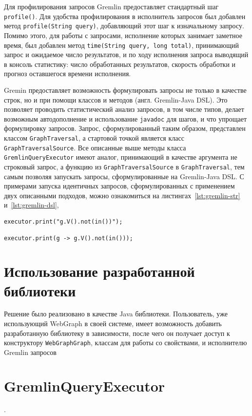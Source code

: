 \documentclass[times,specification,annotation]{itmo-student-thesis}
\begin{document}
Для профилирования запросов Gremlin предоставляет стандартный шаг \texttt{profile()}. Для удобства профилирования в исполнитель запросов был добавлен метод \texttt{profile(String query)}, добавляющий этот шаг к изначальному запросу. Помимо этого, для работы с запросами, исполнение которых занимает заметное время, был добавлен метод \texttt{time(String query, long total)}, принимающий запрос и ожидаемое число результатов, и по ходу исполнения запроса выводящий в консоль статистику: число обработанных результатов, скорость обработки и прогноз оставшегося времени исполнения.

Gremin предоставляет возможность формулировать запросы не только в качестве строк, но и при помощи классов и методов (англ. Gremlin-Java DSL). Это позволяет проводить статистический анализ запросов, в том числе типов, делает возможным автодополнение и использование \texttt{javadoc} для шагов, и что упрощает формулировку запросов. Запрос, сформулированный таким образом, представлен классом \texttt{GraphTraversal}, а стартовой точкой является класс \texttt{GraphTraversalSource}. Все описанные выше методы класса \texttt{GremlinQueryExecutor} имеют аналог, принимающий в качестве аргумента не строковый запрос, а функцию из \texttt{GraphTraversalSource} в \texttt{GraphTraversal}, тем самым позволяя запускать запросы, сформулированные на Gremlin-Java DSL. С примерами запуска идентичных запросов, сформулированных с применением двух описанными подходов, можно ознакомиться на листингах~\ref{lst:gremlin-str} и~\ref{lst:gremlin-dsl},

\begin{lstlisting}[float=!h,caption={Строковый Gremlin  запрос},label={lst:gremlin-str}]
executor.print("g.V().not(in())");
\end{lstlisting}

\begin{lstlisting}[float=!h,caption={Запрос на Gremlin-Java DSL},label={lst:gremlin-dsl}]
executor.print(g -> g.V().not(in()));
\end{lstlisting}

\section{Использование разработанной библиотеки}

Решение было реализовано в качестве Java библиотеки. Пользователь, уже использующий WebGraph в своей системе, имеет возможность добавить разработанную библиотеку в зависимости, после чего он получает доступ к конструктору \texttt{WebGraphGraph}, классам для работы со свойствами, и исполнителю Gremlin запросов \section{GremlinQueryExecutor}.
\end{document}
